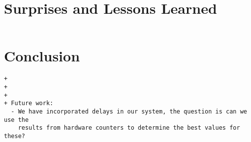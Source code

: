 \documentclass[10pt]{article}
\begin{document}
\section{Surprises and Lessons Learned}
\begin{verbatim}
\end{verbatim}

\section{Conclusion}
\begin{verbatim}
+
+
+
+ Future work:
  - We have incorporated delays in our system, the question is can we use the
    results from hardware counters to determine the best values for these?
\end{verbatim}




\end{document}

